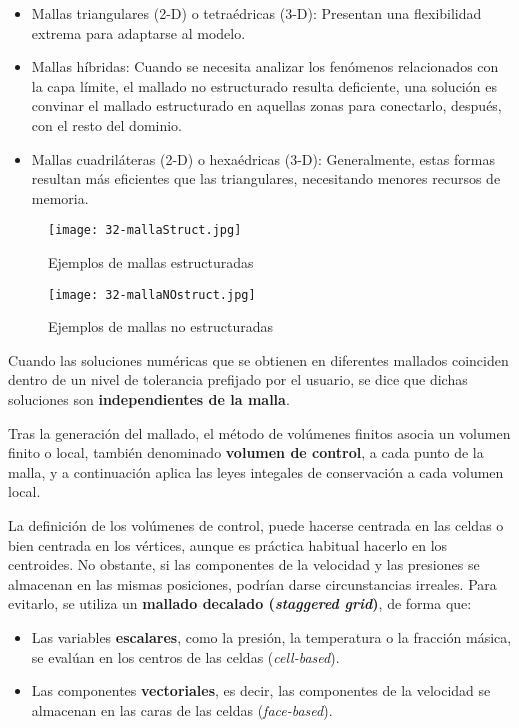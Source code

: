\begin{itemize}
  \begin{itemize}
  \item
    Mallas triangulares (2-D) o tetraédricas (3-D): Presentan una
    flexibilidad extrema para adaptarse al modelo.
  \item
    Mallas híbridas: Cuando se necesita analizar los fenómenos
    relacionados con la capa límite, el mallado no estructurado resulta
    deficiente, una solución es convinar el mallado estructurado en
    aquellas zonas para conectarlo, después, con el resto del dominio.
  \item
    Mallas cuadriláteras (2-D) o hexaédricas (3-D): Generalmente, estas
    formas resultan más eficientes que las triangulares, necesitando
    menores recursos de memoria.
  \end{itemize}
\end{itemize}

\begin{figure}
\centering
\texttt{[image: 32-mallaStruct.jpg]}
\caption{Ejemplos de mallas estructuradas}
\label{fig:mallaStruct}
\end{figure}

\begin{figure}
\centering
\texttt{[image: 32-mallaNOstruct.jpg]}
\caption{Ejemplos de mallas no estructuradas}
\label{fig:mallaNOstruct}
\end{figure}

Cuando las soluciones numéricas que se obtienen en diferentes mallados
coinciden dentro de un nivel de tolerancia prefijado por el usuario, se
dice que dichas soluciones son \textbf{independientes de la malla}.

Tras la generación del mallado, el método de volúmenes finitos asocia un
volumen finito o local, también denominado \textbf{volumen de control},
a cada punto de la malla, y a continuación aplica las leyes integales de
conservación a cada volumen local.

La definición de los volúmenes de control, puede hacerse centrada en las
celdas o bien centrada en los vértices, aunque es práctica habitual
hacerlo en los centroides. No obstante, si las componentes de la
velocidad y las presiones se almacenan en las mismas posiciones, podrían
darse circunstancias irreales. Para evitarlo, se utiliza un
\textbf{mallado decalado (\emph{staggered grid})}, de forma que:

\begin{itemize}
\item
  Las variables \textbf{escalares}, como la presión, la temperatura o la
  fracción másica, se evalúan en los centros de las celdas
  (\emph{cell-based}).
\item
  Las componentes \textbf{vectoriales}, es decir, las componentes de la
  velocidad se almacenan en las caras de las celdas (\emph{face-based}).
\end{itemize}


